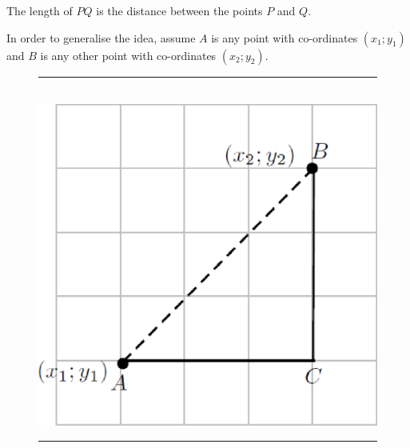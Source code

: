         
        \label{m39107*id67090}The length of \begin{math}PQ\end{math} is the distance between the points \begin{math}P\end{math} and \begin{math}Q\end{math}.\par 
        \label{m39107*id67126}In order to generalise the idea, assume \begin{math}A\end{math} is any point with co-ordinates \begin{math}\left({x}_{1};{y}_{1}\right)\end{math} and \begin{math}B\end{math} is any other point with co-ordinates \begin{math}\left({x}_{2};{y}_{2}\right)\end{math}.\par 
        
    \setcounter{subfigure}{0}


	\begin{figure}[H] %
    \begin{center}
    \rule[.1in]{\figurerulewidth}{.005in} \\
        \label{m39107*uid39!!!underscore!!!media}\label{m39107*uid39!!!underscore!!!printimage}\includegraphics{col11306.imgs/m39107_MG10C14_016.png} %
        
      \vspace{2pt}
    \vspace{.1in}
    \rule[.1in]{\figurerulewidth}{.005in} \\
        
    \end{center}

 \end{figure}   

